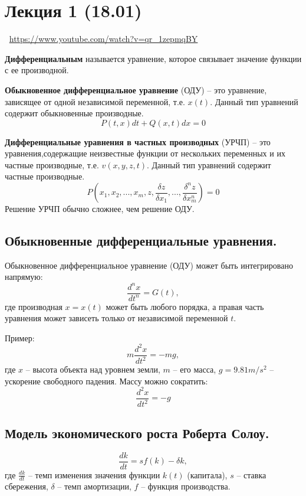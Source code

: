 \section{Лекция 1 (18.01)}

\large \faYoutube \normalsize $\>$ \url{https://www.youtube.com/watch?v=qr_1zepmqBY}

\begin{definition}
    \textbf{Дифференциальным} называется уравнение, которое связывает значение функции с ее производной.
\end{definition}

\begin{definition}
    \textbf{Обыкновенное дифференциальное уравнение} (ОДУ) -- это уравнение, зависящее от одной независимой переменной, т.е. $x(t)$. Данный тип уравнений содержит обыкновенные производные.
    \[
        P(t,x) dt + Q(x,t) dx = 0
    \]
\end{definition}

\begin{definition}
    \textbf{Дифференциальные уравнения в частных производных} (УРЧП) -- это уравнения,содержащие неизвестные функции от нескольких переменных и их частные производные, т.е. $v(x,y,z,t)$. Данный тип уравнений содержит частные производные.
    \[
        P(x_1, x_2, ..., x_m, z, \frac{\delta z}{\delta x_1}, ..., \frac{\delta^n z}{\delta x_m^n}) = 0
    \]
    Решение УРЧП обычно сложнее, чем решение ОДУ.
\end{definition}

\subsection{Обыкновенные дифференциальные уравнения.}

Обыкновенное дифференциальное уравнение (ОДУ) может быть интегрировано напрямую:
\[
    \frac{d^n x}{d t^n} = G(t),
\]
где производная $x = x(t)$ может быть любого порядка, а правая часть уравнения может зависеть только от независимой переменной $t$.

Пример:
\[
    m \frac{d^2 x}{d t^2} = -mg,
\]
где $x$ -- высота объекта над уровнем земли, $m$ -- его масса, $g = 9.81 m/s^2$ -- ускорение свободного падения.
Массу можно сократить:
\[
    \frac{d^2 x}{d t^2} = -g
\]

\subsection{Модель экономического роста Роберта Солоу.}
\[
    \frac{dk}{dt} = sf(k) - \delta k,
\]
где $\frac{dk}{dt}$ -- темп изменения значения функции $k(t)$ (капитала), $s$ -- ставка сбережения, $\delta$ -- темп амортизации, $f$ -- функция производства.
\newpage

